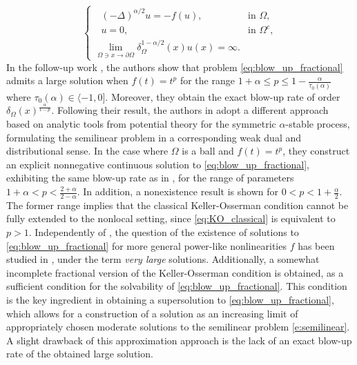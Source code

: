 \documentclass[a4paper,12pt,draft]{article}
\theoremstyle{plain}
\theoremstyle{definition}
\numberwithin{equation}{section}
\renewcommand{\le}{\leqslant}
\newcommand{\1}{1}
\begin{document}
\begin{equation}\label{eq:blow_up_fractional}
    \begin{cases}
       \ \ \ (-\Delta)^{\alpha/2} u = -f(u), &\text{in }\Omega,\\
   \ \ \   u=0,\qquad &\text{in }\Omega^c,\\
   \lim\limits_{\Omega\ni x\to \partial \Omega}\delta_\Omega^{1-\alpha/2}(x)u(x)=\infty. &
    \end{cases}
\end{equation}
In the follow-up work \cite{CFQ}, the authors show that problem \eqref{eq:blow_up_fractional} admits a large solution when $f(t)=t^p$ for the range $1 + \alpha\le  p\le 1 -\frac{\alpha}{\tau_0(\alpha)}$ where $\tau_0(\alpha) \in\langle- 1, 0]$. Moreover, they obtain the exact blow-up rate of order $\delta_\Omega(x)^{\frac{\alpha}{1-p}}$. Following their result, the authors in \cite{benchrouda} adopt a different approach based on analytic tools from potential theory for the symmetric $\alpha$-stable process, formulating the semilinear problem in a corresponding weak dual and distributional sense. In the case where $\Omega$ is a ball and $f(t)=t^p$, they construct an explicit nonnegative continuous solution to \eqref{eq:blow_up_fractional}, exhibiting the same blow-up rate as in \cite{CFQ}, for the range of parameters $1 + \alpha < p < \frac{2+\alpha}{2-\alpha}$. In addition, a nonexistence result is shown for $0 < p < 1 + \frac{\alpha}{2}$. The former range implies that the classical Keller-Osserman condition cannot be fully extended to the nonlocal setting, since \eqref{eq:KO_classical} is equivalent to $p>1$. Independently of \cite{benchrouda}, the question of the existence of solutions to \eqref{eq:blow_up_fractional} for more general power-like nonlinearities $f$ has been studied in \cite{abatangelo2}, under the term \emph{very large} solutions. Additionally, a somewhat incomplete fractional version of the Keller-Osserman condition is obtained, as a sufficient condition for the solvability of \eqref{eq:blow_up_fractional}. This condition is the key ingredient in obtaining a supersolution to \eqref{eq:blow_up_fractional}, which allows for a construction of a solution as an increasing limit of appropriately chosen moderate solutions to the semilinear problem \eqref{e:semilinear}. A slight drawback of this approximation approach is the lack of an exact blow-up rate of the obtained large solution. 
\end{document}
